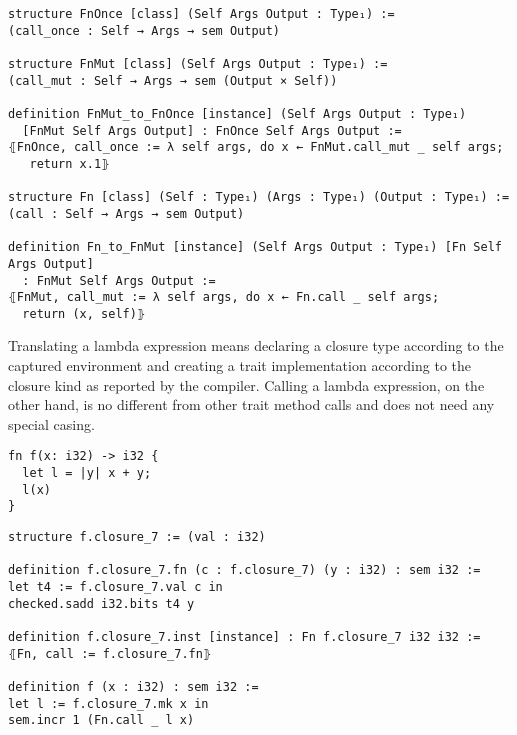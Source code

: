 \begin{verbatim}
structure FnOnce [class] (Self Args Output : Type₁) :=
(call_once : Self → Args → sem Output)

structure FnMut [class] (Self Args Output : Type₁) :=
(call_mut : Self → Args → sem (Output × Self))

definition FnMut_to_FnOnce [instance] (Self Args Output : Type₁)
  [FnMut Self Args Output] : FnOnce Self Args Output :=
⦃FnOnce, call_once := λ self args, do x ← FnMut.call_mut _ self args;
   return x.1⦄

structure Fn [class] (Self : Type₁) (Args : Type₁) (Output : Type₁) :=
(call : Self → Args → sem Output)

definition Fn_to_FnMut [instance] (Self Args Output : Type₁) [Fn Self Args Output]
  : FnMut Self Args Output :=
⦃FnMut, call_mut := λ self args, do x ← Fn.call _ self args;
  return (x, self)⦄
\end{verbatim}

Translating a lambda expression means declaring a closure type according to the
captured environment and creating a trait implementation according to the
closure kind as reported by the compiler. Calling a lambda expression, on the
other hand, is no different from other trait method calls and does not need any
special casing.

\vspace{1em}\noindent\begin{minipage}{0.4\textwidth}
  \begin{verbatim}
fn f(x: i32) -> i32 {
  let l = |y| x + y;
  l(x)
}
\end{verbatim}
\end{minipage}
\begin{minipage}{0.6\textwidth}
\begin{verbatim}
structure f.closure_7 := (val : i32)

definition f.closure_7.fn (c : f.closure_7) (y : i32) : sem i32 :=
let t4 := f.closure_7.val c in
checked.sadd i32.bits t4 y

definition f.closure_7.inst [instance] : Fn f.closure_7 i32 i32 :=
⦃Fn, call := f.closure_7.fn⦄

definition f (x : i32) : sem i32 :=
let l := f.closure_7.mk x in
sem.incr 1 (Fn.call _ l x)
\end{verbatim}
\end{minipage}
